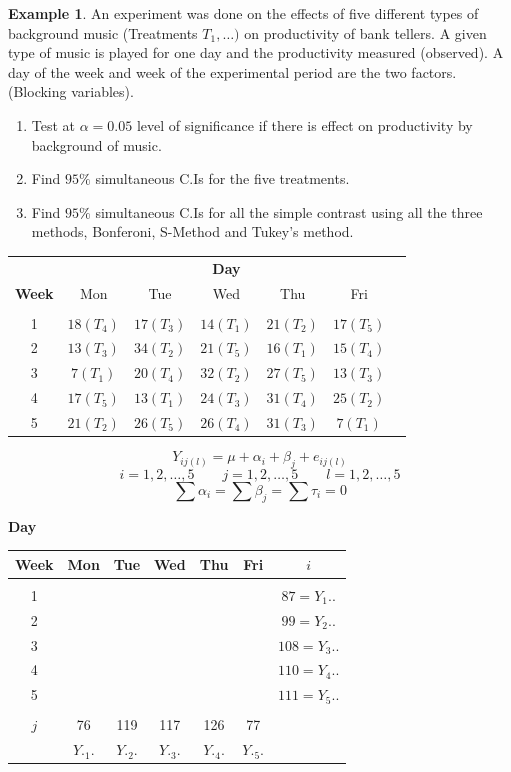 \documentclass[11pt,a4paper]{article}
\theoremstyle{definition}
\newtheorem{exa}[thm]{Example}
\begin{document}
\begin{exa}\label{res:exa:2.5.2}
An experiment was done on the effects of five different types of background music (Treatments $T_1,\ldots )$ on productivity of bank tellers. A given type of music is played for one day and the productivity measured (observed). A day of the week and week of the experimental period are the two factors. (Blocking variables).
\begin{enumerate}
\item Test at $\alpha = 0.05$ level of significance if there is effect on productivity by background of music.
\item Find $95\%$ simultaneous C.Is for the five treatments.
\item Find $95\%$ simultaneous C.Is for all the simple contrast using all the three methods, Bonferoni, S-Method and Tukey's method.\\
\end{enumerate}




\begin{table}[H]
\centering
\begin{tabular}{c|cccccc|}
& \multicolumn{5}{c}{\textbf{Day}}\\
\textbf{Week} & Mon & Tue & Wed & Thu & Fri\\
\hline
&&&&&\\
1 & $18 (T_4)$ & $17 (T_3)$ & $14 (T_1)$ & $21 (T_2)$ & $17 (T_5)$\\
2 & $13 (T_3)$ & $34 (T_2)$ & $21 (T_5)$ & $16 (T_1)$ & $15 (T_4)$\\
3 & $7 (T_1) $ & $20 (T_4)$ & $32 (T_2)$ & $27 (T_5)$ & $13 (T_3)$\\
4 & $17 (T_5)$ & $13 (T_1)$ & $24 (T_3)$ & $31 (T_4)$ & $25 (T_2)$\\
5 & $21 (T_2)$ & $26 (T_5)$ & $26 (T_4)$ & $31 (T_3)$ & $7  (T_1)$\\
\end{tabular}
\end{table}

$$Y_{ij(l)} = \mu +\alpha_i + \beta_j + e_{ij(l)}$$
$$i=1,2,\ldots ,5\qquad  j=1,2,\ldots ,5\qquad  l=1,2,\ldots ,5$$
$$\sum \alpha_i=\sum \beta_j=\sum \tau_i =0$$


\begin{table}[H]
\centering
\textbf{Day}\\
\begin{tabular}{c|ccccc|c}
\textbf{Week} & Mon & Tue & Wed & Thu & Fri & $i$\\
\hline
&&&&&&\\
1 &&&&&& $87 = Y_1..$\\
2 &&&&&& $99 = Y_2..$\\
3 &&&&&& $108 = Y_3..$\\
4 &&&&&& $110 = Y_4..$\\
5 &&&&&& $111 = Y_5..$\\
\hline
&&&&&&\\
$j$ & 76 & 119 & 117 & 126 & 77\\
    & $Y._1.$ & $Y._2.$ & $Y._3.$ & $Y._4.$ & $Y._5.$ & \\
\end{tabular}
\end{table}



\end{exa}
\end{document}
